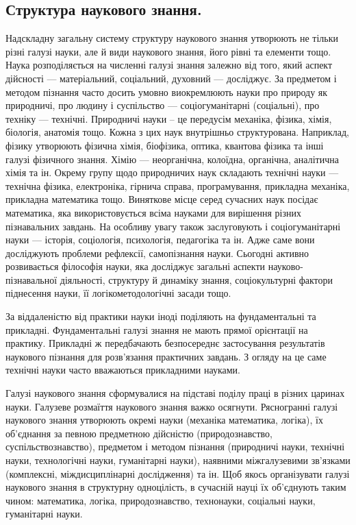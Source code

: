 \subsection{Структура наукового знання.}
Надскладну загальну систему структуру
наукового знання утворюють не тільки різні галузі науки, але й види наукового
знання, його рівні та елементи тощо. Наука розподіляється на численні галузі
знання залежно від того, який аспект дійсності --- матеріальний, соціальний,
духовний --- досліджує. За предметом і методом пізнання часто досить умовно
виокремлюють науки про природу як природничі, про людину і суспільство ---
соціогуманітарні (соціальні), про техніку --- технічні. Природничі науки – це
передусім механіка, фізика, хімія, біологія, анатомія тощо. Кожна з цих наук
внутрішньо структурована. Наприклад, фізику утворюють фізична хімія,
біофізика, оптика, квантова фізика та інші галузі фізичного знання. Хімію ---
неорганічна, колоїдна, органічна, аналітична хімія та ін. Окрему групу щодо
природничих наук складають технічні науки --- технічна фізика, електроніка,
гірнича справа, програмування, прикладна механіка, прикладна математика
тощо. Виняткове місце серед сучасних наук посідає математика, яка
використовується всіма науками для вирішення різних пізнавальних завдань.
На особливу увагу також заслуговують і соціогуманітарні науки --- історія,
соціологія, психологія, педагогіка та ін. Адже саме вони досліджують проблеми
рефлексії, самопізнання науки. Сьогодні активно розвивається філософія науки,
яка досліджує загальні аспекти науково-пізнавальної діяльності, структуру й
динаміку знання, соціокультурні фактори піднесення науки, її логікометодологічні засади тощо.

За віддаленістю від практики науки іноді поділяють на фундаментальні та
прикладні. Фундаментальні галузі знання не мають прямої орієнтації на
практику. Прикладні ж передбачають безпосереднє застосування результатів
наукового пізнання для розв’язання практичних завдань. З огляду на це саме
технічні науки часто вважаються прикладними науками.

Галузі наукового знання сформувалися на підставі поділу праці в різних
царинах науки. Галузеве розмаїття наукового знання важко осягнути.
Рясногранні галузі наукового знання утворюють окремі науки (механіка
математика, логіка), їх об’єднання за певною предметною дійсністю
(природознавство, суспільствознавство), предметом і методом пізнання
(природничі науки, технічні науки, технологічні науки, гуманітарні науки),
наявними міжгалузевими зв’язками (комплексні, міждисциплінарні
дослідження) та ін. Щоб якось організувати галузі наукового знання в
структурну одноцілість, в сучасній науці їх об’єднують таким чином:
математика, логіка, природознавство, технонауки, соціальні науки, гуманітарні
науки.

